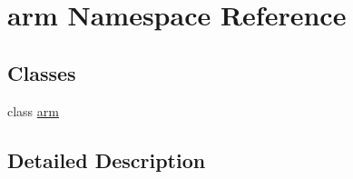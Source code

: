 \hypertarget{namespacearm}{\section{arm Namespace Reference}
\label{namespacearm}
}
\subsection*{Classes}
\begin{DoxyCompactItemize}
\item 
class \hyperlink{classarm_1_1arm}{arm}
\end{DoxyCompactItemize}


\subsection{Detailed Description}

